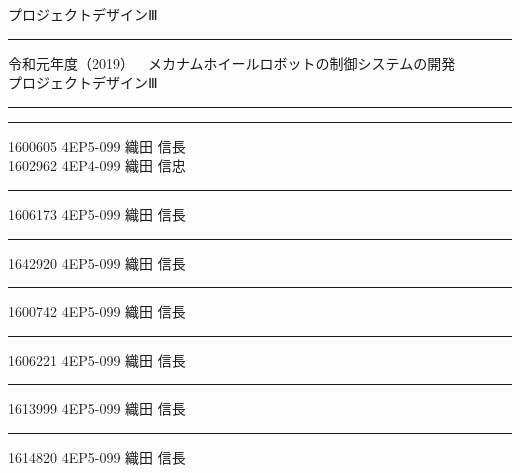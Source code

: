 \documentclass[a4paper,twocolumn]{ltjsarticle}
\begin{document}
プロジェクトデザインⅢ\vspace{1.27mm}
\hrule
\par\vspace{1mm}
令和元年度（2019）~~メカナムホイールロボットの制御システムの開発\\   %
プロジェクトデザインⅢ\vspace{1.27mm}
\hrule
\par\vspace{1mm}
\newpage
\hrule
\vspace{1mm}
\hspace{1cm}1600605	4EP5-099 織田 信長\\\hspace{1cm}1602962	4EP4-099 織田 信忠\vspace{1mm}%
\hrule\par\vspace{1mm}
\hspace{1cm}1606173	4EP5-099 織田 信長\vspace{1mm}
\vspace{0.6cm}
\hrule\par\vspace{1mm}
\hspace{1cm}1642920	4EP5-099 織田 信長\vspace{1mm}%
\vspace{0.6cm}
\hrule\par\vspace{1mm}
\hspace{1cm}1600742	4EP5-099 織田 信長\vspace{1mm} %
\vspace{0.6cm}
\hrule\par\vspace{1mm}
\hspace{1cm}1606221	4EP5-099 織田 信長\vspace{1mm} %
\vspace{0.6cm}
\hrule\par\vspace{1mm}
\hspace{1cm}1613999	4EP5-099 織田 信長\vspace{1mm} %
\vspace{0.6cm}
\hrule\par\vspace{1mm}
\hspace{1cm}1614820	4EP5-099 織田 信長\vspace{1mm} %
\vspace{0.6cm}
\end{document}
